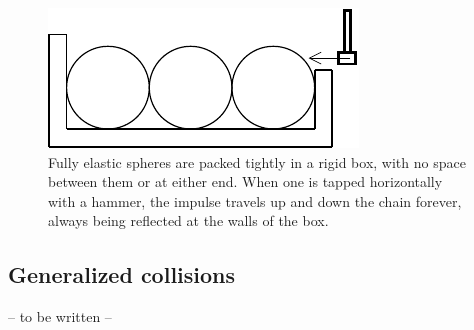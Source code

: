 \begin{figure}
\centerline{\includegraphics{figures/contacts3}}
\caption{Fully elastic spheres are packed tightly in a rigid box, with no space between them or at
    either end. When one is tapped horizontally with a hammer, the impulse travels up and down the
    chain forever, always being reflected at the walls of the box.\label{contacts3Figure}}
\end{figure}


\subsection{Generalized collisions\label{generalizedCollisions}}

-- to be written --
